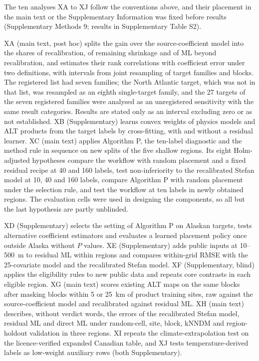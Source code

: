 The ten analyses XA to XJ follow the conventions above, and their placement in the main text or the Supplementary Information was fixed before results (Supplementary Methods 9; results in Supplementary Table S2).

XA (main text, post hoc) splits the gain over the source-coefficient model into the shares of recalibration, of remaining shrinkage and of ML beyond recalibration, and estimates their rank correlations with coefficient error under two definitions, with intervals from joint resampling of target families and blocks. The registered list had seven families; the North Atlantic target, which was not in that list, was resampled as an eighth single-target family, and the 27 targets of the seven registered families were analysed as an unregistered sensitivity with the same result categories. Results are stated only as an interval excluding zero or as not established. XB (Supplementary) learns convex weights of physics models and ALT products from the target labels by cross-fitting, with and without a residual learner. XC (main text) applies Algorithm P, the ten-label diagnostic and the method rule in sequence on new splits of the five shallow regions. Its eight Holm-adjusted hypotheses compare the workflow with random placement and a fixed residual recipe at 40 and 160 labels, test non-inferiority to the recalibrated Stefan model at 10, 40 and 160 labels, compare Algorithm P with random placement under the selection rule, and test the workflow at ten labels in newly obtained regions. The evaluation cells were used in designing the components, so all but the last hypothesis are partly unblinded.

XD (Supplementary) selects the setting of Algorithm P on Alaskan targets, tests alternative coefficient estimators and evaluates a learned placement policy once outside Alaska without $P$ values. XE (Supplementary) adds public inputs at 10--500~m to residual ML within regions and compares within-grid RMSE with the 25-covariate model and the recalibrated Stefan model. XF (Supplementary, blind) applies the eligibility rules to new public data and repeats core contrasts in each eligible region. XG (main text) scores existing ALT maps on the same blocks after masking blocks within 5 or 25~km of product training sites, raw against the source-coefficient model and recalibrated against residual ML. XH (main text) describes, without verdict words, the errors of the recalibrated Stefan model, residual ML and direct ML under random-cell, site, block, kNNDM and region-holdout validation in three regions. XI repeats the climate-extrapolation test on the licence-verified expanded Canadian table, and XJ tests temperature-derived labels as low-weight auxiliary rows (both Supplementary).

